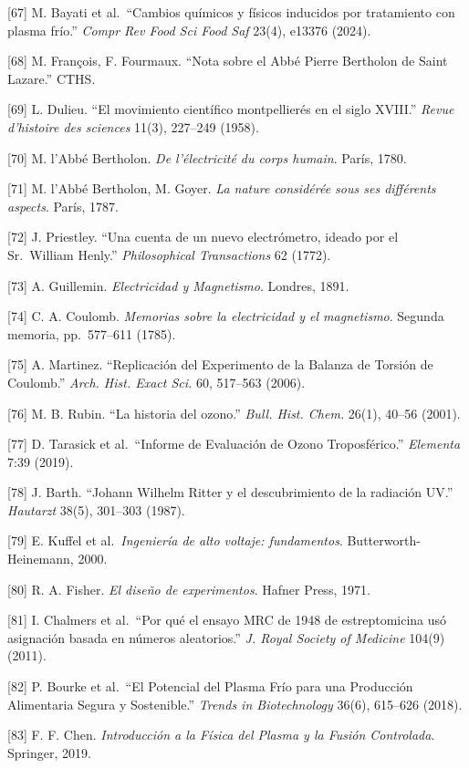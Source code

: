\documentclass[
]{article}
\begin{document}
{[}67{]} M. Bayati et al.~``Cambios químicos y físicos inducidos por
tratamiento con plasma frío.'' \emph{Compr Rev Food Sci Food Saf} 23(4),
e13376 (2024).

{[}68{]} M. François, F. Fourmaux. ``Nota sobre el Abbé Pierre Bertholon
de Saint Lazare.'' CTHS.

{[}69{]} L. Dulieu. ``El movimiento científico montpellierés en el siglo
XVIII.'' \emph{Revue d'histoire des sciences} 11(3), 227--249 (1958).

{[}70{]} M. l'Abbé Bertholon. \emph{De l'électricité du corps humain}.
París, 1780.

{[}71{]} M. l'Abbé Bertholon, M. Goyer. \emph{La nature considérée sous
ses différents aspects}. París, 1787.

{[}72{]} J. Priestley. ``Una cuenta de un nuevo electrómetro, ideado por
el Sr.~William Henly.'' \emph{Philosophical Transactions} 62 (1772).

{[}73{]} A. Guillemin. \emph{Electricidad y Magnetismo}. Londres, 1891.

{[}74{]} C. A. Coulomb. \emph{Memorias sobre la electricidad y el
magnetismo}. Segunda memoria, pp.~577--611 (1785).

{[}75{]} A. Martinez. ``Replicación del Experimento de la Balanza de
Torsión de Coulomb.'' \emph{Arch. Hist. Exact Sci.} 60, 517--563 (2006).

{[}76{]} M. B. Rubin. ``La historia del ozono.'' \emph{Bull. Hist.
Chem.} 26(1), 40--56 (2001).

{[}77{]} D. Tarasick et al.~``Informe de Evaluación de Ozono
Troposférico.'' \emph{Elementa} 7:39 (2019).

{[}78{]} J. Barth. ``Johann Wilhelm Ritter y el descubrimiento de la
radiación UV.'' \emph{Hautarzt} 38(5), 301--303 (1987).

{[}79{]} E. Kuffel et al.~\emph{Ingeniería de alto voltaje:
fundamentos}. Butterworth-Heinemann, 2000.

{[}80{]} R. A. Fisher. \emph{El diseño de experimentos}. Hafner Press,
1971.

{[}81{]} I. Chalmers et al.~``Por qué el ensayo MRC de 1948 de
estreptomicina usó asignación basada en números aleatorios.'' \emph{J.
Royal Society of Medicine} 104(9) (2011).

{[}82{]} P. Bourke et al.~``El Potencial del Plasma Frío para una
Producción Alimentaria Segura y Sostenible.'' \emph{Trends in
Biotechnology} 36(6), 615--626 (2018).

{[}83{]} F. F. Chen. \emph{Introducción a la Física del Plasma y la
Fusión Controlada}. Springer, 2019.
\end{document}
